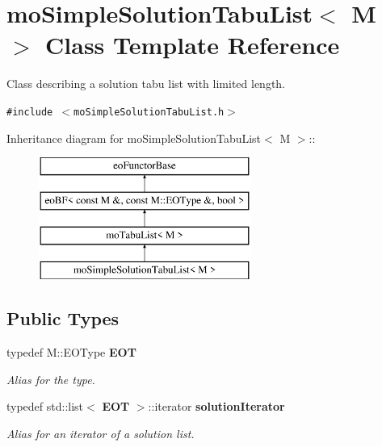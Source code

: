 \section{mo\-Simple\-Solution\-Tabu\-List$<$ M $>$ Class Template Reference}
\label{classmo_simple_solution_tabu_list}
Class describing a solution tabu list with limited length.  


{\tt \#include $<$mo\-Simple\-Solution\-Tabu\-List.h$>$}

Inheritance diagram for mo\-Simple\-Solution\-Tabu\-List$<$ M $>$::\begin{figure}[H]
\begin{center}
\leavevmode
\includegraphics[height=4cm]{classmo_simple_solution_tabu_list}
\end{center}
\end{figure}
\subsection*{Public Types}
\begin{CompactItemize}
\item 
typedef M::EOType {\bf EOT}\label{classmo_simple_solution_tabu_list_w0}

\begin{CompactList}\small\item\em Alias for the type. \item\end{CompactList}\item 
typedef std::list$<$ {\bf EOT} $>$::iterator {\bf solution\-Iterator}\label{classmo_simple_solution_tabu_list_w1}

\begin{CompactList}\small\item\em Alias for an iterator of a solution list. \item\end{CompactList}\end{CompactItemize}
